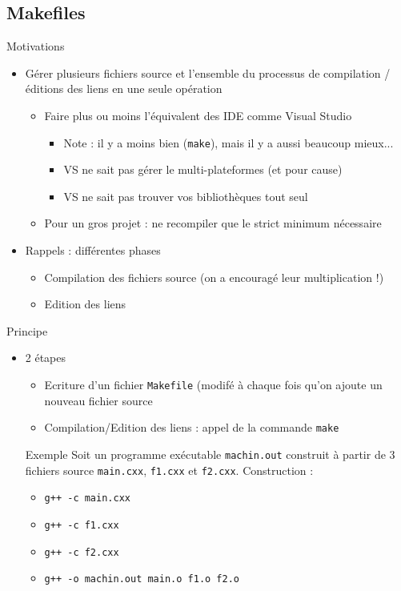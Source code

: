 \subsection{Makefiles}

\begin{frame}{Motivations}
  \begin{itemize}
  \item Gérer plusieurs fichiers source et l'ensemble du processus de compilation / éditions des liens en une seule opération
  \begin{itemize}
  \item Faire plus ou moins l'équivalent des IDE comme Visual Studio
	\begin{itemize}
		\item Note : il y a moins bien (\texttt{make}), mais il y a aussi beaucoup mieux...
		\item VS ne sait pas gérer le multi-plateformes (et pour cause)
		\item VS ne sait pas trouver vos bibliothèques tout seul
	\end{itemize}
  \item Pour un gros projet : ne recompiler que le strict minimum nécessaire
  \end{itemize}
  \item Rappels : différentes phases
  \begin{itemize}
  \item Compilation des fichiers source (on a encouragé leur multiplication !)
  \item Edition des liens
  \end{itemize}

  \end{itemize}
\end{frame}

\begin{frame}{Principe}
  \begin{itemize}
  \item 2 étapes
  \begin{itemize}
  \item Ecriture d'un fichier \texttt{Makefile} (modifé à chaque fois qu'on ajoute un nouveau fichier source
  \item Compilation/Edition des liens : appel de la commande \texttt{make}
  \end{itemize}
  \begin{exampleblock}{Exemple}
  	Soit un programme exécutable \texttt{machin.out} construit à partir de 3 fichiers source \texttt{main.cxx}, \texttt{f1.cxx} et \texttt{f2.cxx}. Construction :
  	\begin{itemize}
  		\item \texttt{g++ -c main.cxx}
  		\item \texttt{g++ -c f1.cxx}
  		\item \texttt{g++ -c f2.cxx}
  		\item \texttt{g++ -o machin.out main.o f1.o f2.o}
  	\end{itemize}
  \end{exampleblock}
  \end{itemize}
\end{frame}

